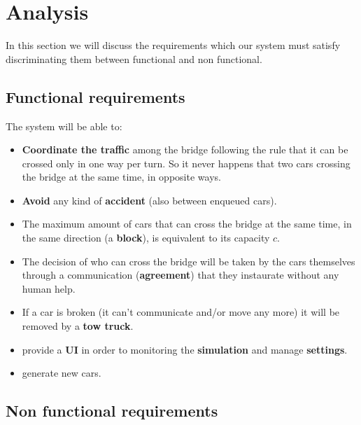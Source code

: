 \chapter{Analysis}\label{ch:analysis}

In this section we will discuss the requirements which our system must satisfy 
discriminating them between functional and non functional.

\section{Functional requirements}

The system will be able to:
\begin{itemize}
    \item \textbf{Coordinate the traffic} among the bridge following the rule 
        that it can be crossed only in one way per turn. 
        So it never happens that two cars crossing the bridge at the same time, 
        in opposite ways.
    \item \textbf{Avoid} any kind of \textbf{accident} (also between enqueued cars).
    \item The maximum amount of cars that can cross the bridge at the same time, 
        in the same direction (a \textbf{block}), is equivalent to its capacity $c$.
    \item The decision of who can cross the bridge will be taken by the cars 
        themselves through a communication (\textbf{agreement}) that they 
        instaurate without any human help.
    \item If a car is broken (it can't communicate and/or move any more) 
        it will be removed by a \textbf{tow truck}.
    \item provide a \textbf{UI} in order to monitoring the \textbf{simulation} 
        and manage \textbf{settings}.
    \item generate new cars.
\end{itemize}


\section{Non functional requirements}

